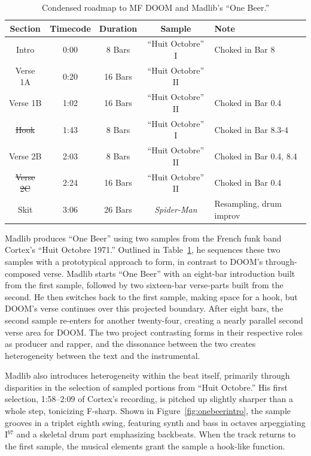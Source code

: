     \begin{table}[ht]
        \centering
            \begin{tabular}{|c|c|c|c|l|}
                 \hline
                  Section         & Timecode & Duration & Sample              & Note                    \\ \hline
                  Intro           & 0:00     & 8 Bars   & ``Huit Octobre'' I  & Choked in Bar 8         \\ \hline
                  Verse 1A        & 0:20     & 16 Bars  & ``Huit Octobre'' II &                         \\ \hline
                  Verse 1B        & 1:02     & 16 Bars  & ``Huit Octobre'' II & Choked in Bar 0.4       \\ \hline
                  \sout{Hook}     & 1:43     & 8 Bars   & ``Huit Octobre'' I  & Choked in Bar 8.3-4     \\ \hline
                  Verse 2B        & 2:03     & 8 Bars   & ``Huit Octobre'' II & Choked in Bar 0.4, 8.4  \\ \hline
                  \sout{Verse 2C} & 2:24     & 16 Bars  & ``Huit Octobre'' II & Choked in Bar 0.4       \\ \hline
                  Skit            & 3:06     & 26 Bars  & \textit{Spider-Man} & Resampling, drum improv \\ \hline
             \end{tabular}
        \caption{Condensed roadmap to MF DOOM and Madlib's ``One Beer.''}
        \label{tab:onebeer}
    \end{table}

Madlib produces ``One Beer'' using two samples from the French funk band Cortex's ``Huit Octobre
1971.'' Outlined in Table~\ref{tab:onebeer}, he sequences these two samples with a prototypical
approach to form, in contrast to DOOM's through-composed verse. Madlib starts ``One Beer'' with
an eight-bar introduction built from the first sample, followed by two sixteen-bar verse-parts
built from the second. He then switches back to the first sample, making space for a hook, 
but DOOM's verse continues over this projected boundary. After eight bars, the second sample
re-enters for another twenty-four, creating a nearly parallel second verse area for DOOM. The
two project contrasting forms in their respective roles as producer and rapper, and the dissonance
between the two creates heterogeneity between the text and the instrumental.

Madlib also introduces heterogeneity within the beat itself, primarily through disparities
in the selection of sampled portions from ``Huit Octobre.'' His first selection, 1:58--2:09
of  Cortex's recording, is pitched up slightly sharper than a whole step, tonicizing F-sharp.
Shown in Figure~\ref{fig:onebeerintro}, the sample grooves in a triplet eighth swing, featuring
synth and bass  in octaves arpeggiating I$^{b7}$ and a skeletal drum part emphasizing backbeats.
When the track returns to the first sample, the musical elements grant the sample a 
hook-like function.

